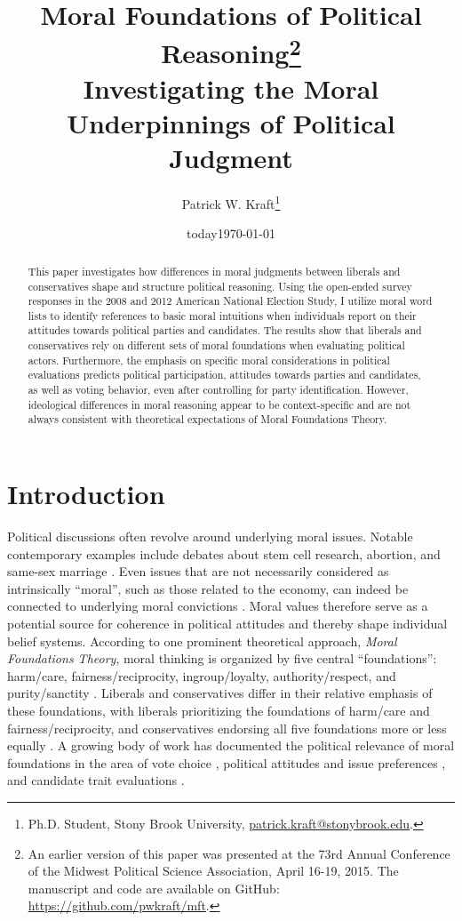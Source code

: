 \documentclass[12pt]{article}
\author{Patrick W. Kraft\footnote{Ph.D. Student, Stony Brook University, \href{mailto:patrick.kraft@stonybrook.edu}{patrick.kraft@stonybrook.edu}.
}}
\date{today}
\title{Moral Foundations of Political Reasoning\footnote{An earlier version of this paper was presented at the 73rd Annual Conference of the Midwest Political Science Association, April 16-19, 2015. The manuscript and code are available on GitHub: \url{https://github.com/pwkraft/mft}.}\\
\large{Investigating the Moral Underpinnings of Political Judgment}}
\date{\today}
\begin{document}
\maketitle
\onehalfspacing

\begin{abstract}
This paper investigates how differences in moral judgments between liberals and conservatives shape and structure political reasoning. Using the open-ended survey responses in the 2008 and 2012 American National Election Study, I utilize moral word lists to identify references to basic moral intuitions when individuals report on their attitudes towards political parties and candidates. The results show that liberals and conservatives rely on different sets of moral foundations when evaluating political actors. Furthermore, the emphasis on specific moral considerations in political evaluations predicts political participation, attitudes towards parties and candidates, as well as voting behavior, even after controlling for party identification. However, ideological differences in moral reasoning appear to be context-specific and are not always consistent with theoretical expectations of Moral Foundations Theory.

\end{abstract}
\newpage


\section{Introduction}

Political discussions often revolve around underlying moral issues. Notable contemporary examples include debates about stem cell research, abortion, and same-sex marriage \citep[e.g.][]{koleva2012tracing,clifford2015concerns}. Even issues that are not necessarily considered as intrinsically ``moral'', such as those related to the economy, can indeed be connected to underlying moral convictions \citep{ryan2014reconsidering}. Moral values therefore serve as a potential source for coherence in political attitudes and thereby shape individual belief systems. According to one prominent theoretical approach, \textit{Moral Foundations Theory}, moral thinking is organized by five central ``foundations'': harm/care, fairness/reciprocity, ingroup/loyalty, authority/respect, and purity/sanctity \citep{haidt2008moral}. Liberals and conservatives differ in their relative emphasis of these foundations, with liberals prioritizing the foundations of harm/care and fairness/reciprocity, and conservatives endorsing all five foundations more or less equally \citep{graham2009liberals}. A growing body of work has documented the political relevance of moral foundations in the area of vote choice \citep{iyer2010beyond, franks2015using}, political attitudes and issue preferences \citep{koleva2012tracing, low2015moral, clifford2015concerns}, and candidate trait evaluations \citep{clifford2014linking}.
\end{document}
